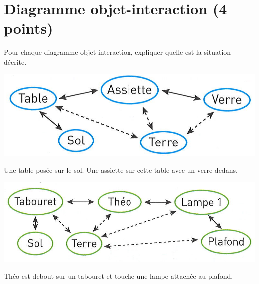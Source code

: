 \section{Diagramme objet-interaction (4 points)}\label{doi}

Pour chaque diagramme objet-interaction, expliquer quelle est la situation décrite.

\begin{multicols}{2}
	\begin{questions}
		\question	\includegraphics[scale=0.35]{doi1}
		
		\begin{solution}
			Une table posée sur le sol. Une assiette sur cette table avec un verre dedans.
		\end{solution}
		
		\question \includegraphics[scale=0.35]{doi2}
		\begin{solution}
			Théo est debout sur un tabouret et touche une lampe attachée au plafond.
		\end{solution}
		
	\end{questions}
\end{multicols}